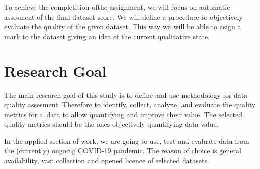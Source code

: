To achieve the completition ofthe assignment, we will focus on automatic assesment of the final dataset score.
We will define a procedure to objectively evaluate the quality of the given dataset.
This way we will be able to asign a mark to the dataset giving an idea of the current qualitative state.

\section*{Research Goal}

The main research goal of this study is to define and use methodology for data quality assesment.
Therefore to identify, collect, analyze, and evaluate the quality metrics for a~data to allow quantifying and improve their value.
The selected quality metrics should be the ones objectively quantifying data value.

In the applied section of work, we are going to use, test and evaluate data from the (currently) ongoing COVID-19 pandemic.
The reason of choice is general availability, vast collection and opened licence of selected datasets.
